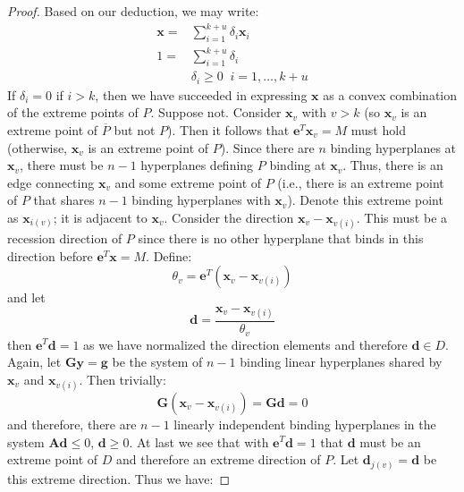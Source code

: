 \begin{proof}
Based on our deduction, we may write:
\begin{equation}
\begin{aligned}
\mathbf{x} = & \sum_{i=1}^{k + u}\delta_i\mathbf{x}_i\\
1 = & \sum_{i=1}^{k+u}\delta_i\\
& \delta_i \geq 0\;\;i=1,\dots,k+u
\end{aligned}
\label{eqn:PenUlt}
\end{equation}
If $\delta_i = 0$ if $i > k$, then we have succeeded in expressing $\mathbf{x}$ as a convex combination of the extreme points of $P$. Suppose not. Consider $\mathbf{x}_v$ with $v > k$ (so $\mathbf{x}_v$ is an extreme point of $\overline{P}$ but not $P$). Then it follows that $\mathbf{e}^T\mathbf{x}_v = M$ must hold (otherwise, $\mathbf{x}_v$ is an extreme point of $P$). Since there are $n$ binding hyperplanes at $\mathbf{x}_v$, there must be $n-1$ hyperplanes defining $P$ binding at $\mathbf{x}_v$. Thus, there is an edge connecting $\mathbf{x}_v$ and some extreme point of $P$ (i.e., there is an extreme point of $P$ that shares $n-1$ binding hyperplanes with $\mathbf{x}_v$). Denote this extreme point as $\mathbf{x}_{i(v)}$; it is adjacent to $\mathbf{x}_v$.  Consider the direction $\mathbf{x}_v - \mathbf{x}_{v(i)}$. This must be a recession direction of $P$ since there is no other hyperplane that binds in this direction before $\mathbf{e}^T\mathbf{x} = M$. Define:
\begin{displaymath}
\theta_v = \mathbf{e}^T(\mathbf{x}_v - \mathbf{x}_{v(i)})
\end{displaymath}
and let
\begin{displaymath}
\mathbf{d} = \frac{\mathbf{x}_v - \mathbf{x}_{v(i)}}{\theta_v}
\end{displaymath}
then $\mathbf{e}^T\mathbf{d} = 1$ as we have normalized the direction elements and therefore $\mathbf{d} \in D$. Again, let $\mathbf{G}\mathbf{y} = \mathbf{g}$ be the system of $n-1$ binding linear hyperplanes shared by $\mathbf{x}_v$ and $\mathbf{x}_{v(i)}$. Then trivially:
\begin{displaymath}
\mathbf{G}(\mathbf{x}_v - \mathbf{x}_{v(i)}) = \mathbf{G}\mathbf{d} = 0
\end{displaymath}
and therefore, there are $n-1$ linearly independent binding hyperplanes in the system $\mathbf{A}\mathbf{d} \leq 0$, $\mathbf{d} \geq 0$. At last we see that with $\mathbf{e}^T\mathbf{d} = 1$ that $\mathbf{d}$ must be an extreme point of $D$ and therefore an extreme direction of $P$. Let $\mathbf{d}_{j(v)} = \mathbf{d}$ be this extreme direction. Thus we have:

\end{proof}
